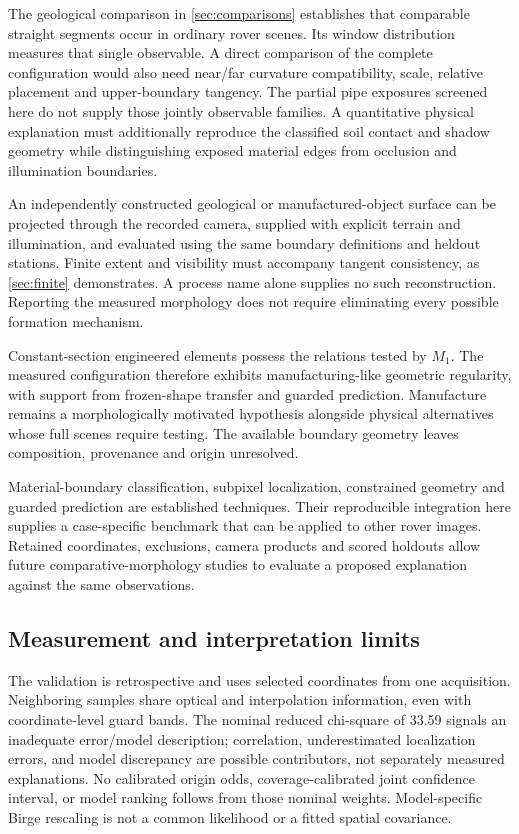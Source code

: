 \documentclass[11pt,letterpaper]{article}
\begin{document}
The geological comparison in \cref{sec:comparisons} establishes that comparable straight segments occur in ordinary rover scenes. Its window distribution measures that single observable. A direct comparison of the complete configuration would also need near/far curvature compatibility, scale, relative placement and upper-boundary tangency. The partial pipe exposures screened here do not supply those jointly observable families. A quantitative physical explanation must additionally reproduce the classified soil contact and shadow geometry while distinguishing exposed material edges from occlusion and illumination boundaries.

An independently constructed geological or manufactured-object surface can be projected through the recorded camera, supplied with explicit terrain and illumination, and evaluated using the same boundary definitions and heldout stations. Finite extent and visibility must accompany tangent consistency, as \cref{sec:finite} demonstrates. A process name alone supplies no such reconstruction. Reporting the measured morphology does not require eliminating every possible formation mechanism.

Constant-section engineered elements possess the relations tested by $M_1$. The measured configuration therefore exhibits manufacturing-like geometric regularity, with support from frozen-shape transfer and guarded prediction. Manufacture remains a morphologically motivated hypothesis alongside physical alternatives whose full scenes require testing. The available boundary geometry leaves composition, provenance and origin unresolved.

Material-boundary classification, subpixel localization, constrained geometry and guarded prediction are established techniques. Their reproducible integration here supplies a case-specific benchmark that can be applied to other rover images. Retained coordinates, exclusions, camera products and scored holdouts allow future comparative-morphology studies to evaluate a proposed explanation against the same observations.

\subsection{Measurement and interpretation limits}
\label{sec:limits}

The validation is retrospective and uses selected coordinates from one acquisition. Neighboring samples share optical and interpolation information, even with coordinate-level guard bands. The nominal reduced chi-square of 33.59 signals an inadequate error/model description; correlation, underestimated localization errors, and model discrepancy are possible contributors, not separately measured explanations. No calibrated origin odds, coverage-calibrated joint confidence interval, or model ranking follows from those nominal weights. Model-specific Birge rescaling is not a common likelihood or a fitted spatial covariance.
\end{document}
